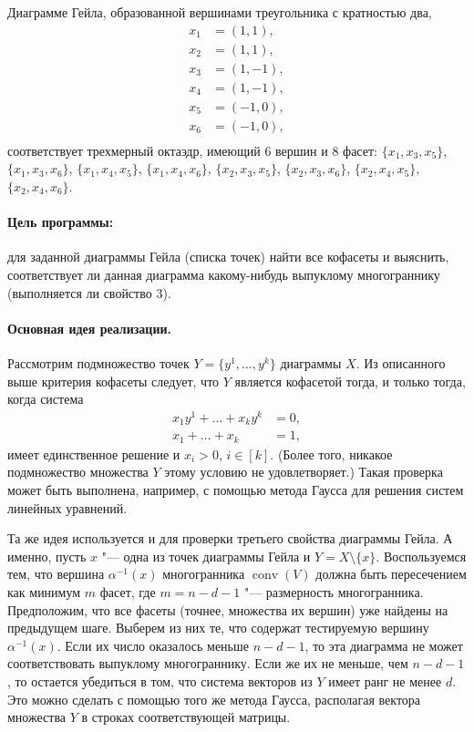 \documentclass[12pt]{article}
\DeclareMathOperator{\conv}{conv}
\begin{document}
Диаграмме Гейла, образованной вершинами треугольника с кратностью два,
\[
\begin{aligned}
x_1 &= (1,  1), \\
x_2 &= (1,  1), \\
x_3 &= (1, -1), \\
x_4 &= (1, -1), \\
x_5 &= (-1, 0), \\
x_6 &= (-1, 0), \\
\end{aligned}
\]
соответствует трехмерный октаэдр, имеющий 6 вершин и 8 фасет: $\{x_1, x_3, x_5\}$, $\{x_1, x_3, x_6\}$, $\{x_1, x_4, x_5\}$, $\{x_1, x_4, x_6\}$, $\{x_2, x_3, x_5\}$, $\{x_2, x_3, x_6\}$, $\{x_2, x_4, x_5\}$, $\{x_2, x_4, x_6\}$. 


\paragraph{Цель программы:}
для заданной диаграммы Гейла (списка точек) найти все кофасеты и выяснить, соответствует ли данная диаграмма какому-нибудь выпуклому многограннику (выполняется ли свойство 3).

\paragraph{Основная идея реализации.}
Рассмотрим подмножество точек $Y = \{y^1, \dots, y^k\}$ диаграммы $X$.
Из описанного выше критерия кофасеты следует, что $Y$ является кофасетой тогда, и только тогда, когда система
\begin{align*}
x_1 y^1 + \dots + x_k y^k &= 0, \\
x_1 + \dots + x_k &= 1,
\end{align*}
имеет единственное решение и $x_i > 0$, $i \in [k]$.
(Более того, никакое подмножество множества $Y$ этому условию не удовлетворяет.)
Такая проверка может быть выполнена, например, с помощью метода Гаусса для решения систем линейных уравнений.

Та же идея используется и для проверки третьего свойства диаграммы Гейла. А именно, пусть $x$ "--- одна из точек диаграммы Гейла и $Y = X \setminus \{x\}$.
Воспользуемся тем, что вершина $\alpha^{-1}(x)$ многогранника 
$\conv(V)$ должна быть пересечением как минимум $m$ фасет, где $m = n - d - 1$ "--- размерность многогранника. Предположим, что все фасеты (точнее, множества их вершин) уже найдены на предыдущем шаге. Выберем из них те, что содержат тестируемую вершину $\alpha^{-1}(x)$. Если их число оказалось меньше $n - d - 1$, то эта диаграмма не может соответствовать выпуклому многограннику. Если же их не меньше, чем $n - d - 1$, то остается убедиться в том, что система векторов из $Y$ имеет ранг не менее $d$. Это можно сделать с помощью того же метода Гаусса, располагая вектора множества $Y$ в строках соответствующей матрицы.
\end{document}
